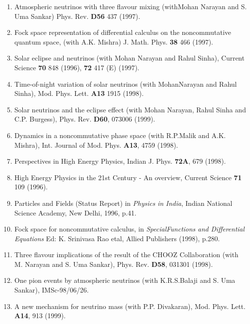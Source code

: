\begin{enumerate}
\item Atmospheric neutrinos with three flavour mixing (with\break Mohan
Narayan and S. Uma Sankar) Phys. Rev. {\bf D56} 437 (1997).

\item Fock space representation of differential calculus on the
noncommutative quantum space, (with A.K. Mishra) 
J. Math. Phys. {\bf 38} 466 (1997).

\item Solar eclipse and neutrinos (with Mohan Narayan and Rahul Sinha), 
Current Science {\bf 70} 848 (1996), {\bf 72} 417 (E) (1997).

\item Time-of-night variation of solar neutrinos (with Mohan\break Narayan and
Rahul Sinha), Mod. Phys. Lett. {\bf A13} 1915 (1998).

\item Solar neutrinos and the eclipse effect (with Mohan Narayan,  Rahul
Sinha and C.P. Burgess), Phys. Rev. {\bf D60}, 073006 (1999).

\item Dynamics in a noncommutative phase space (with R.P.\break Malik and A.K.
Mishra), Int. Journal of Mod. Phys. {\bf A13}, 4759 (1998).

\item Perspectives in High Energy Physics, Indian J. Phys. {\bf 72A}, 
679 (1998).

\item High Energy Physics in the 21st Century - An overview, Current
Science {\bf 71} 109 (1996).

\item Particles and Fields (Status Report) in {\it {Physics in
India}}, Indian National Science Academy, New Delhi, 1996, p.41.

\item Fock space for noncommutative calculus, in {\it Special\break Functions
and Differential Equations} Ed: K. Srinivasa Rao etal, Allied Publishers
(1998), p.280.

\item Three flavour implications of the result of the CHOOZ\break
Collaboration (with M. Narayan and S. Uma Sankar), Phys. Rev. {\bf D58}, 
031301 (1998).

\item One pion events by atmospheric neutrinos (with K.R.S.\break Balaji and
S. Uma Sankar), IMSc-98/06/26.

\item A new mechanism for neutrino mass (with P.P. Divakaran), Mod.
Phys. Lett. {\bf A14}, 913 (1999).


\end{enumerate}
